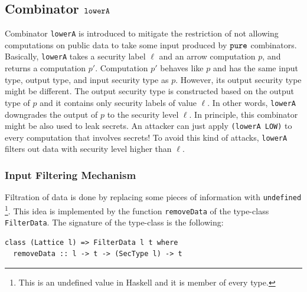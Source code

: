 \documentclass[times, 10pt,twocolumn]{article}
\begin{document}
\subsection{Combinator $\mathtt{lowerA}$} \label{sec:lowerA}
Combinator \texttt{lowerA} is introduced to mitigate the restriction 
of not allowing computations on public data to take some input
produced by $\mathtt{pure}$ combinators. Basically, \texttt{lowerA}
takes a security label $\ell$ and an arrow computation $p$, 
and returns a computation $p'$. Computation $p'$ behaves 
like $p$ and has the 
same input type, output type, and input security type as $p$. However, 
its output security type might be different. The output security 
type is constructed based on the output type of $p$ and it 
contains only security labels of value $\ell$. 
In other words, \texttt{lowerA} downgrades the output of $p$ 
to the security level $\ell$. In principle, this combinator 
might be also used to leak secrets. 
An attacker can just apply \texttt{(lowerA LOW)} to every computation 
that involves secrets! To avoid this kind of attacks, 
\texttt{lowerA} filters out data with
security level higher than $\ell$. 



\subsubsection*{Input Filtering Mechanism}

Filtration of data is done by replacing some pieces of
information with \texttt{undefined}
\footnote{This is an undefined value in Haskell
  and it is member of every type.}. 
This idea is implemented by the function \texttt{removeData} of the
type-class \texttt{FilterData}. 
The signature of the type-class is the
following:
\begin{Verbatim}[fontsize=\footnotesize]
class (Lattice l) => FilterData l t where
  removeData :: l -> t -> (SecType l) -> t
\end{Verbatim}
\end{document}
